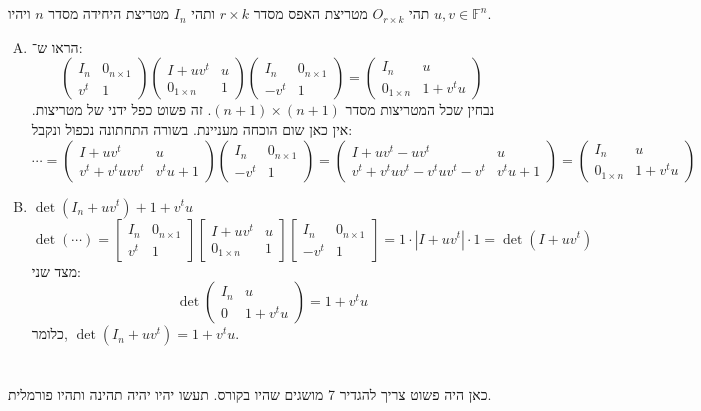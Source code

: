 \documentclass[]{article}
\newcommand\F         {\mathbb{F}}
\newcommand\pms[1]    {\begin{pmatrix}
		#1
\end{pmatrix}}
\newcommand\bms[1]    {\begin{bmatrix}
		#1
\end{bmatrix}}
\begin{document}
	\section{}
	תהי $O_{r \times k}$ מטריצת האפס מסדר $r \times k$ ותהי $I_n$ מטריצת היחידה מסדר $n$ ויהיו $u, v \in \F^n$.
	\begin{enumerate}[(A)]
		\item הראו ש־: 
		\[ \pms{I_n & 0_{ n\times 1} \\ v^t & 1}\pms{I + uv^t & u \\ 0_{1 \times n} & 1}\pms{I_n & 0_{n \times 1} \\ -v^t & 1} = \pms{I_n & u \\ 0_{1 \times n} & 1 + v^tu} \]
		נבחין שכל המטריצות מסדר $(n + 1) \times (n + 1)$. זה פשוט כפל ידני של מטריצות. אין כאן שום הוכחה מעניינת. בשורה התחתונה נכפול ונקבל: 
		\[ \cdots = \pms{I + uv^t & u \\ v^t + v^t u vv^t & v^tu + 1}\pms{I_n & 0_{n \times 1} \\ -v^t & 1} = \pms{I + uv^t -uv^t & u \\ v^t + v^tuv^t - v^tuv^t - v^t & v^t u + 1} = \pms{I_n & u \\ 0_{1 \times n} & 1 + v^tu} \]
		\item $\det(I_n + uv^t) + 1 + v^tu$
		\[ \det (\cdots) = \bms{I_n & 0_{ n\times 1} \\ v^t & 1}\bms{I + uv^t & u \\ 0_{1 \times n} & 1}\bms{I_n & 0_{n \times 1} \\ -v^t & 1} = 1 \cdot |I + uv^t| \cdot 1 = \det (I + uv^t) \]
		מצד שני: 
		\[ \det\pms{I_n & u \\ 0 & 1 + v^tu}  = 1 + v^tu \]
		כלומר, $\det(I_n + uv^t) = 1 + v^tu$. 
	\end{enumerate}
	
	\section{}
	כאן היה פשוט צריך להגדיר 7 מושגים שהיו בקורס. תעשו יהיו יהיה תהינה ותהיו פורמלית. 
	
\end{document}
